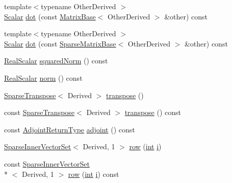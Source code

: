 \begin{DoxyCompactItemize}
\item 
{\footnotesize template$<$typename Other\-Derived $>$ }\\\hyperlink{class_sparse_matrix_base_af39d70f2b7e775e9e17b666cd24128c8}{Scalar} \hyperlink{class_sparse_matrix_base_ad804a1617f4103f0f8d45909c19a3f87}{dot} (const \hyperlink{class_matrix_base}{Matrix\-Base}$<$ Other\-Derived $>$ \&other) const 
\item 
{\footnotesize template$<$typename Other\-Derived $>$ }\\\hyperlink{class_sparse_matrix_base_af39d70f2b7e775e9e17b666cd24128c8}{Scalar} \hyperlink{class_sparse_matrix_base_a0148f7943b153ab2338aad0d6d5a0cef}{dot} (const \hyperlink{class_sparse_matrix_base}{Sparse\-Matrix\-Base}$<$ Other\-Derived $>$ \&other) const 
\item 
\hyperlink{class_sparse_matrix_base_a615d56082efd03b5f31015cc4900e72f}{Real\-Scalar} \hyperlink{class_sparse_matrix_base_af3b16733106a0645cb0e2b19530a557b}{squared\-Norm} () const 
\item 
\hyperlink{class_sparse_matrix_base_a615d56082efd03b5f31015cc4900e72f}{Real\-Scalar} \hyperlink{class_sparse_matrix_base_a13d9c7ddee873b0398206b2ffeab07fb}{norm} () const 
\item 
\hyperlink{class_sparse_transpose}{Sparse\-Transpose}$<$ Derived $>$ \hyperlink{class_sparse_matrix_base_a58180d974c2ffcff5f8e3a2af831272d}{transpose} ()
\item 
const \hyperlink{class_sparse_transpose}{Sparse\-Transpose}$<$ Derived $>$ \hyperlink{class_sparse_matrix_base_a76373117b6cc540a61d54a5bfc4aecaf}{transpose} () const 
\item 
const \hyperlink{class_sparse_matrix_base_af76ed9177bd4fb93e1e60e683ec5b0b7}{Adjoint\-Return\-Type} \hyperlink{class_sparse_matrix_base_a8f3cdb2bd92fa3a014a0dd0c8a8e5f08}{adjoint} () const 
\item 
\hyperlink{class_sparse_inner_vector_set}{Sparse\-Inner\-Vector\-Set}$<$ Derived, 1 $>$ \hyperlink{class_sparse_matrix_base_a08eb42df97c87c91e2ad8c5dc2d8bd42}{row} (\hyperlink{ioapi_8h_a787fa3cf048117ba7123753c1e74fcd6}{int} \hyperlink{uavobjecttemplate_8m_a6f6ccfcf58b31cb6412107d9d5281426}{i})
\item 
const \hyperlink{class_sparse_inner_vector_set}{Sparse\-Inner\-Vector\-Set}\\*
$<$ Derived, 1 $>$ \hyperlink{class_sparse_matrix_base_a9d3727a845a41ba80babe63e23ed3603}{row} (\hyperlink{ioapi_8h_a787fa3cf048117ba7123753c1e74fcd6}{int} \hyperlink{uavobjecttemplate_8m_a6f6ccfcf58b31cb6412107d9d5281426}{i}) const 

\end{DoxyCompactItemize}
